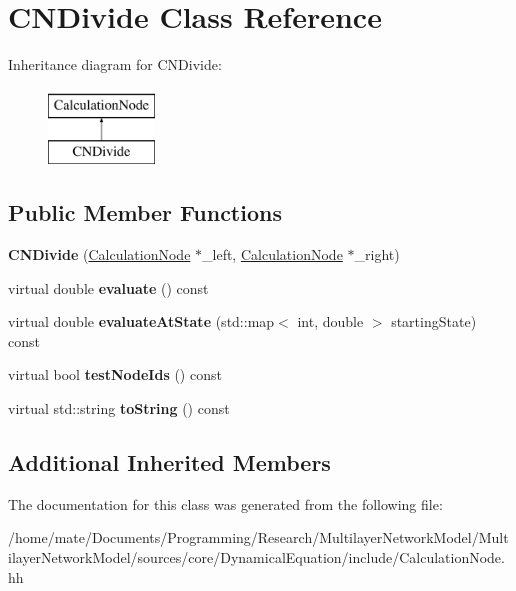 \hypertarget{classCNDivide}{}\section{C\+N\+Divide Class Reference}
\label{classCNDivide}
Inheritance diagram for C\+N\+Divide\+:\begin{figure}[H]
\begin{center}
\leavevmode
\includegraphics[height=2.000000cm]{classCNDivide}
\end{center}
\end{figure}
\subsection*{Public Member Functions}
\begin{DoxyCompactItemize}
\item 
{\bfseries C\+N\+Divide} (\hyperlink{classCalculationNode}{Calculation\+Node} $\ast$\+\_\+left, \hyperlink{classCalculationNode}{Calculation\+Node} $\ast$\+\_\+right)\hypertarget{classCNDivide_afeb9424f787f42ebf0edb7926a0e80fd}{}\label{classCNDivide_afeb9424f787f42ebf0edb7926a0e80fd}

\item 
virtual double {\bfseries evaluate} () const \hypertarget{classCNDivide_a416c36cec11a481a20bbe3409c1e42db}{}\label{classCNDivide_a416c36cec11a481a20bbe3409c1e42db}

\item 
virtual double {\bfseries evaluate\+At\+State} (std\+::map$<$ int, double $>$ starting\+State) const \hypertarget{classCNDivide_a77752426072bc2bda3b0ca4fdc03f871}{}\label{classCNDivide_a77752426072bc2bda3b0ca4fdc03f871}

\item 
virtual bool {\bfseries test\+Node\+Ids} () const \hypertarget{classCNDivide_a411f954df8b87778f20058ce6601d3f8}{}\label{classCNDivide_a411f954df8b87778f20058ce6601d3f8}

\item 
virtual std\+::string {\bfseries to\+String} () const \hypertarget{classCNDivide_a301fb85c372986362aa6b4930f0d79c5}{}\label{classCNDivide_a301fb85c372986362aa6b4930f0d79c5}

\end{DoxyCompactItemize}
\subsection*{Additional Inherited Members}


The documentation for this class was generated from the following file\+:\begin{DoxyCompactItemize}
\item 
/home/mate/\+Documents/\+Programming/\+Research/\+Multilayer\+Network\+Model/\+Multilayer\+Network\+Model/sources/core/\+Dynamical\+Equation/include/Calculation\+Node.\+hh\end{DoxyCompactItemize}

